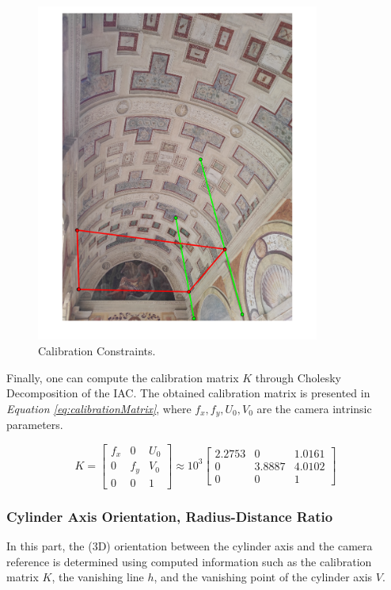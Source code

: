 \documentclass[12pt,a4paper]{article}
\begin{document}
\begin{figure}[H]
    \centering
    \includegraphics[width=0.83\textwidth]{Images/PalazzoTe_IAC_constraints.png}
    \caption[Calibration Constraints.]{Calibration Constraints.}
    \label{fig:calibConstraints}
\end{figure}

Finally, one can compute the calibration matrix $K$ through Cholesky Decomposition of the IAC. The obtained calibration matrix is presented in \textit{Equation \ref{eq:calibrationMatrix}}, where $f_x,f_y,U_0,V_0$ are the camera intrinsic parameters.

\begin{equation}
    K =
    \begin{bmatrix}
    f_x & 0 & U_0\\
    0 & f_y & V_0\\
    0 & 0 & 1
    \end{bmatrix}
    \approx 10^3
    \begin{bmatrix}
    2.2753 & 0 & 1.0161\\
    0 & 3.8887 & 4.0102\\
    0 & 0 & 1
    \end{bmatrix}
    \label{eq:calibrationMatrix}
\end{equation}
\bigskip

\subsubsection{Cylinder Axis Orientation, Radius-Distance Ratio}\label{sec:toRadiusDistanceRatio}
In this part, the (3D) orientation between the cylinder axis and the camera reference is determined using computed information such as the calibration matrix $K$, the vanishing line $h$, and the vanishing point of the cylinder axis $V$.\\
\end{document}
